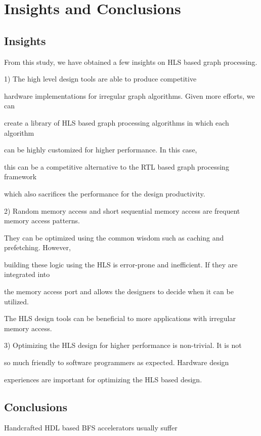 \section{Insights and Conclusions} \label{sec:conclusion}

\subsection{Insights}

From this study, we have obtained a few insights on HLS based graph processing.

1) The high level design tools are able to produce competitive

hardware implementations for irregular graph algorithms. Given more efforts, we can 

create a library of HLS based graph processing algorithms in which each algorithm 

can be highly customized for higher performance. In this case, 

this can be a competitive alternative to the RTL based graph processing framework 

which also sacrifices the performance for the design productivity.

2) Random memory access and short sequential memory access are frequent memory access patterns.

They can be optimized using the common wisdom such as caching and prefetching. However, 

building these logic using the HLS is error-prone and inefficient. If they are integrated into 

the memory access port and allows the designers to decide when it can be utilized. 

The HLS design tools can be beneficial to more applications with irregular memory access.

3) Optimizing the HLS design for higher performance is non-trivial. It is not

so much friendly to software programmers as expected. Hardware design

experiences are important for optimizing the HLS based design.



\subsection{Conclusions}

Handcrafted HDL based BFS accelerators usually suffer 

